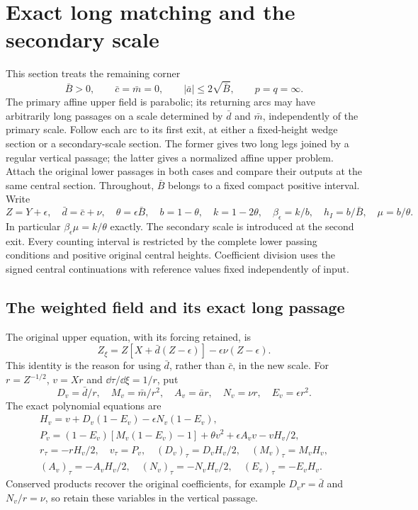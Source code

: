 \section{Exact long matching and the secondary scale}
\label{rw:secondary-scale}

This section treats the remaining corner
\[
 \bar B>0,\qquad \bar c=\bar m=0,\qquad
 |\bar a|\le2\sqrt{\bar B},\qquad p=q=\infty.
\]
The primary affine upper field is parabolic; its returning arcs may
have arbitrarily long passages on a scale determined by $\bar d$ and
$\bar m$, independently of the primary scale. Follow each arc to its
first exit, at either a fixed-height wedge section or a secondary-scale
section. The former gives two long
legs joined by a regular vertical passage; the latter gives a normalized
affine upper problem. Attach the original lower passages in both cases
and compare their outputs at the same central section.
Throughout, $\bar B$ belongs to a fixed compact positive interval.
Write
\[
 Z=Y+\epsilon,\quad \bar d=\bar c+\nu,\quad
 \theta=\epsilon\bar B,\quad b=1-\theta,\quad k=1-2\theta,\quad
 \beta_\epsilon=k/b,\quad h_I=b/\bar B,\quad \mu=b/\theta.
\]
In particular $\beta_\epsilon\mu=k/\theta$ exactly.
The secondary scale is introduced at the second exit. Every counting
interval is restricted by the complete lower passing conditions and
positive original central heights. Coefficient division uses the signed
central continuations with reference values fixed independently of input.

\subsection{The weighted field and its exact long passage}

The original upper equation, with its forcing retained, is
\begin{equation}\label{rw:secondary:retained}
 Z_\xi=Z[X+\bar d(Z-\epsilon)]-\epsilon\nu(Z-\epsilon).
\end{equation}
This identity is the reason for using $\bar d$, rather than $\bar c$,
in the new scale. For $r=Z^{-1/2}$, $v=Xr$ and
$\dd\tau/\dd\xi=1/r$, put
\[
 D_v=\bar d/r,\quad M_v=\bar m/r^2,\quad
 A_v=\bar a r,\quad N_v=\nu r,\quad E_v=\epsilon r^2.
\]
The exact polynomial equations are
\begin{equation}\label{rw:secondary:vertical}
\begin{gathered}
 H_v=v+D_v(1-E_v)-\epsilon N_v(1-E_v),\\
 P_v=(1-E_v)[M_v(1-E_v)-1]+\theta v^2+\epsilon A_vv-vH_v/2,\\
 r_\tau=-rH_v/2,\quad v_\tau=P_v,\quad
 (D_v)_\tau=D_vH_v/2,\quad (M_v)_\tau=M_vH_v,\\
 (A_v)_\tau=-A_vH_v/2,\quad (N_v)_\tau=-N_vH_v/2,\quad
 (E_v)_\tau=-E_vH_v.
\end{gathered}
\end{equation}
Conserved products recover the original coefficients, for example
$D_vr=\bar d$ and $N_v/r=\nu$, so retain these variables in the
vertical passage.

